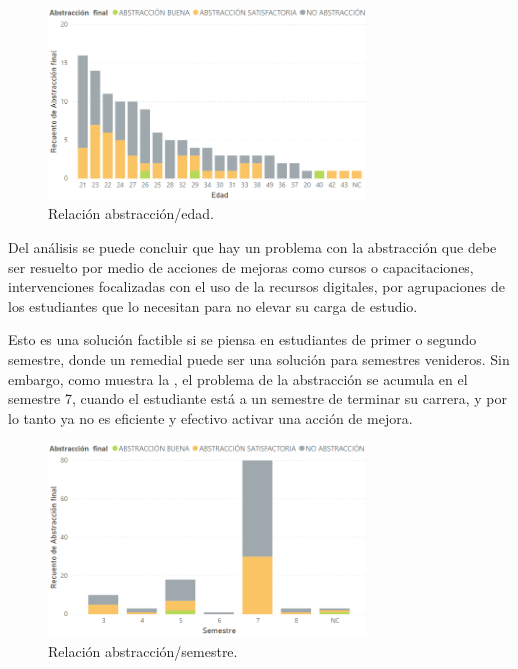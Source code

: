 \documentclass{textolivre}
\begin{document}
\begin{figure}[htbp]
 \centering
 \includegraphics[width=0.75\textwidth]{figura5.png}
 \caption{Relación abstracción/edad.}
 \label{figura 5}
\end{figure}

Del análisis se puede concluir que hay un problema con la abstracción que debe ser resuelto por medio de acciones de mejoras como cursos o capacitaciones, intervenciones focalizadas con el uso de la recursos digitales, por agrupaciones de los estudiantes que lo necesitan para no elevar su carga de estudio.

Esto es una solución factible si se piensa en estudiantes de primer o segundo semestre, donde un remedial puede ser una solución para semestres venideros. Sin embargo, como muestra la , el problema de la abstracción se acumula en el semestre 7, cuando el estudiante está a un semestre de terminar su carrera, y por lo tanto ya no es eficiente y efectivo activar una acción de mejora.

\begin{figure}[htbp]
 \centering
 \includegraphics[width=0.75\textwidth]{figura6.png}
 \caption{Relación abstracción/semestre.}
 \label{figura 6}
\end{figure}
\end{document}
